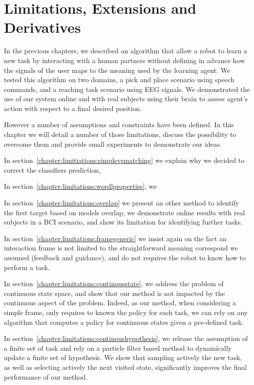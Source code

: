 
%
\chapter{Limitations, Extensions and Derivatives}
\label{chapter:limitations}
\minitoc


In the previous chapters, we described an algorithm that allow a robot to learn a new task by interacting with a human partners without defining in advance how the signals of the user maps to the meaning used by the learning agent. We tested this algorithm on two domains, a pick and place scenario using speech commands, and a reaching task scenario using EEG signals. We demonstrated the use of our system online and with real subjects using their brain to assess agent's action with respect to a final desired position.

However a number of assumptions and constraints have been defined. In this chapter we will detail a number of those limitations, discuss the possibility to overcome them and provide small experiments to demonstrate our ideas. 

In section~\ref{chapter:limitiations:simplevsmatching} we explain why we decided to correct the classifiers prediction, 

In section~\ref{chapter:limitations:wordlproperties}, we 

In section~\ref{chapter:limitations:overlap} we present an other method to identify the first target based on models overlap, we demonstrate online results with real subjects in a BCI scenario, and show its limitation for identifying further tasks.

In section~\ref{chapter:limitations:framegeneric} we insist again on the fact an interaction frame is not limited to the straightforward meaning correspond we assumed (feedback and guidance), and do not requires the robot to know how to perform a task.

In section~\ref{chapter:limitations:continousstate}, we address the problem of continuous state space, and show that our method is not impacted by the continuous aspect of the problem. Indeed, as our method, when considering a simple frame, only requires to known the policy for each task, we can rely on any algorithm that computes a policy for continuous states given a pre-defined task.

In section~\ref{chapter:limitations:continoushypothesis}, we release the assumption of a finite set of task and rely on a particle filter based method to dynamically update a finite set of hypothesis. We show that sampling actively the new task, as well as selecting actively the next visited state, significantly improves the final performance of our method.

